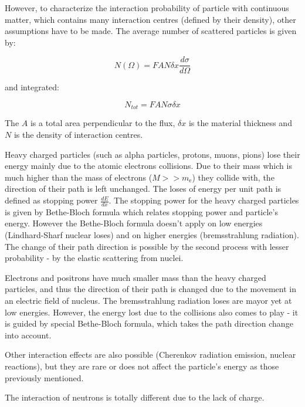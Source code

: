 However, to characterize the interaction probability of particle with continuous matter, which contains many interaction centres (defined by their density), other assumptions have to be made. The average number of scattered particles is given by:

 \begin{equation}
 N(\Omega) = FAN \delta x \frac{d\sigma}{d\Omega}
 \end{equation}


and integrated:

 \begin{equation}
 N_{tot} = FAN\sigma \delta x 
 \end{equation}

The $A$ is a total area perpendicular to the flux, $\delta x$ is the material thickness and $N$ is the density of interaction centres.
\par 
 
Heavy charged particles (such as alpha particles, protons, muons, pions) lose their energy mainly due to the atomic electrons collisions. Due to their mass which is much higher than the mass of electrons ($M >> m_\textrm{e}$) they collide with, the direction of their path is left unchanged. The loses of energy per unit path is defined as stopping power $\frac{dE}{dx}$. The stopping power for the heavy charged particles is given by Bethe-Bloch formula which relates stopping power and particle's energy. However the Bethe-Bloch formula doesn't apply on low energies (Lindhard-Sharf nuclear loses) and on higher energies (bremsstrahlung radiation). The change of their path direction is possible by the second process with lesser probability - by the elastic scattering from nuclei.
\par
Electrons and positrons have much smaller mass than the heavy charged particles, and thus the direction of their path is changed due to the movement in an electric field of nucleus. The bremsstrahlung radiation loses are mayor yet at low energies. However, the energy lost due to the collisions also comes to play - it is guided by special Bethe-Bloch formula, which takes the path direction change into account. 
\par

Other interaction effects are also possible (Cherenkov radiation emission, nuclear reactions), but they are rare or does not affect the particle's energy as those previously mentioned.

\par
The interaction of neutrons is totally different due to the lack of charge. 

